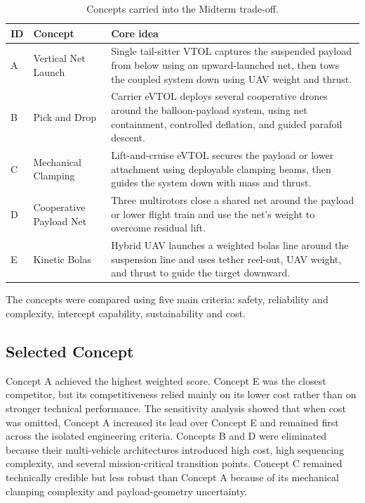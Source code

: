 \begin{table}[H]
\centering
\small
\caption{Concepts carried into the Midterm trade-off.}
\label{tab:exec_concepts_summary}
\renewcommand{\arraystretch}{1.15}
\begin{tabularx}{\textwidth}{@{}p{}p{}X@{}}
\toprule
\textbf{ID} & \textbf{Concept} & \textbf{Core idea} \\
\midrule
A & Vertical Net Launch &
Single tail-sitter VTOL captures the suspended payload from below using an upward-launched net, then tows the coupled system down using UAV weight and thrust. \\

B & Pick and Drop &
Carrier eVTOL deploys several cooperative drones around the balloon-payload system, using net containment, controlled deflation, and guided parafoil descent. \\

C & Mechanical Clamping &
Lift-and-cruise eVTOL secures the payload or lower attachment using deployable clamping beams, then guides the system down with mass and thrust. \\

D & Cooperative Payload Net &
Three multirotors close a shared net around the payload or lower flight train and use the net's weight to overcome residual lift. \\

E & Kinetic Bolas &
Hybrid UAV launches a weighted bolas line around the suspension line and uses tether reel-out, UAV weight, and thrust to guide the target downward. \\
\bottomrule
\end{tabularx}
\end{table}




The concepts were compared using five main criteria: safety, reliability and complexity, intercept capability, sustainability and cost. 

\subsection*{Selected Concept}





Concept A achieved the highest weighted score. Concept E was the closest competitor, but its competitiveness relied mainly on its lower cost rather than on stronger technical performance. The sensitivity analysis showed that when cost was omitted, Concept A increased its lead over Concept E and remained first across the isolated engineering criteria. Concepts B and D were eliminated because their multi-vehicle architectures introduced high cost, high sequencing complexity, and several mission-critical transition points. Concept C remained technically credible but less robust than Concept A because of its mechanical clamping complexity and payload-geometry uncertainty.




